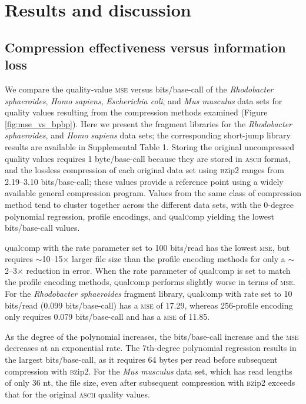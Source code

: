 \documentclass[fleqn,10pt,lineno]{wlpeerj} %
\begin{document}
\section*{Results and discussion}

\subsection*{Compression effectiveness versus information loss}

We compare the quality-value \textsc{mse} versus bits/base-call of the
\textit{Rhodobacter sphaeroides}, \textit{Homo sapiens},
\textit{Escherichia coli}, and \textit{Mus musculus} data sets for
quality values resulting from the compression methods examined (Figure
\ref{fig:mse_vs_bpbp}). Here we present the fragment libraries for the
\textit{Rhodobacter sphaeroides}, and \textit{Homo sapiens} data sets;
the corresponding short-jump library results are available in
Supplemental Table 1. Storing the original uncompressed quality values
requires 1 byte/base-call because they are stored in \textsc{ascii}
format, and the lossless compression of each original data set using
\textsc{bz}ip2 ranges from 2.19--3.10 bits/base-call; these values
provide a reference point using a widely available general compression
program. Values from the same class of compression method tend to
cluster together across the different data sets, with the 0-degree
polynomial regression, profile encodings, and
\textsc{q}ual\textsc{c}omp yielding the lowest bits/base-call values.

\textsc{q}ual\textsc{c}omp with the rate parameter set to 100
bits/read has the lowest \textsc{mse}, but requires
$\sim$10--15$\times$ larger file size than the profile encoding
methods for only a $\sim$2--3$\times$ reduction in error. When the
rate parameter of \textsc{q}ual\textsc{c}omp is set to match the
profile encoding methods, \textsc{q}ual\textsc{c}omp performs slightly
worse in terms of \textsc{mse}. For the \textit{Rhodobacter
  sphaeroides} fragment library, \textsc{q}ual\textsc{c}omp with rate
set to 10 bits/read (0.099 bits/base-call) has a \textsc{mse} of
17.29, whereas 256-profile encoding only requires 0.079 bits/base-call
and has a \textsc{mse} of 11.85.

As the degree of the polynomial increases, the bits/base-call increase
and the \textsc{mse} decreases at an exponential rate. The 7th-degree
polynomial regression results in the largest bits/base-call, as it
requires 64 bytes per read before subsequent compression with
\textsc{bz}ip2. For the \textit{Mus musculus} data set, which has read
lengths of only 36 nt, the file size, even after subsequent
compression with \textsc{bz}ip2 exceeds that for the original
\textsc{ascii} quality values.
\end{document}
